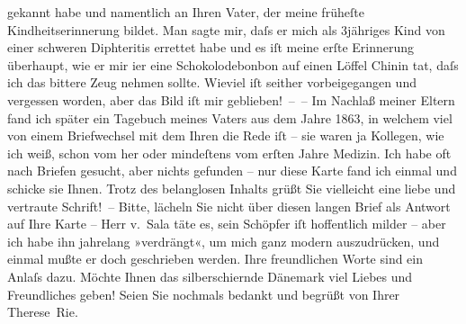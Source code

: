 \begin{ledgroupsized}[t]{13cm}
               gekannt habe und namentlich an Ihren Vater, der meine früheſte Kindheitserinnerung bildet. Man
               sagte mir, daſs er mich als 3jähriges Kind von einer schweren Diphteritis errettet
               habe und es iſt meine erſte Erinnerung überhaupt, wie er mir i{\geminationm}er eine Schokolodebonbon auf einen Löffel Chinin tat,
               daſs ich das bittere Zeug nehmen sollte. Wieviel iſt seither vorbeigegangen und
               vergessen worden, aber das Bild iſt mir geblieben! – – Im Nachlaß meiner Eltern fand ich
               später ein Tagebuch meines Vaters aus dem Jahre 1863, in welchem viel von \introOben{}einem
                  Briefwechsel mit\introOben{} dem Ihren die Rede iſt – sie waren ja Kollegen, wie ich
               weiß, schon vom \label{K_L02572-3v}\label{K_L02572-3h} her oder mindeſtens vom erſten
               Jahre Medizin. Ich habe oft nach Briefen gesucht, aber nichts gefunden – nur diese
               Karte fand ich einmal und schicke sie Ihnen. Trotz {\pb}des
               belanglosen Inhalts grüßt Sie vielleicht eine liebe und vertraute Schrift! –\pend
           \pstart
           Bitte, lächeln Sie nicht über diesen langen Brief als Antwort auf Ihre Karte – Herr v. Sala täte es, sein
               Schöpfer iſt hoffentlich milder – aber ich habe ihn jahrelang »verdrängt«, um mich
               ganz modern auszudrücken, und einmal mußte er doch geschrieben werden. Ihre
               freundlichen Worte sind ein Anlaſs dazu. Möchte Ihnen das silberschi{\geminationm}ernde Dänemark
               viel Liebes und Freundliches geben! Seien Sie nochmals bedankt und begrüßt von
               Ihrer\pend
           \pstart \spacefill\mbox{Therese Rie.}\pend{}
         
         \endnumbering{}\end{ledgroupsized}  \newcommand{\dateiname}{L02572}\newcommand{\titel}{Therese Rie-Andro an Arthur Schnitzler, 3. 5. 1923}\newcommand{\editorInnen}{Martin Anton Müller und Gerd-Hermann Susen}
      